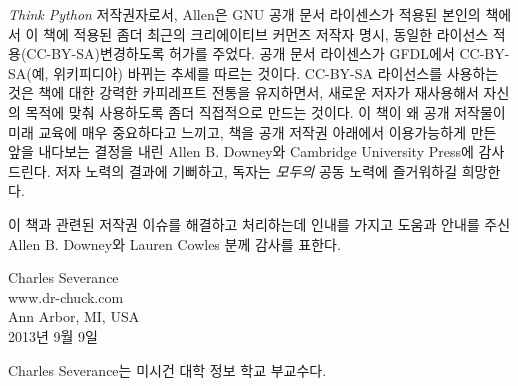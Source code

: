 
\emph{Think Python} 저작권자로서, Allen은 GNU 공개 문서 라이센스가 적용된 본인의 책에서 이 책에 적용된 좀더 최근의 크리에이티브 커먼즈 저작자 명시, 동일한 라이선스 적용(CC-BY-SA)변경하도록 허가를 주었다. 
공개 문서 라이센스가 GFDL에서 CC-BY-SA(예, 위키피디아) 바뀌는 추세를 따르는 것이다.
CC-BY-SA 라이선스를 사용하는 것은 책에 대한 강력한 카피레프트 전통을 유지하면서, 새로운 저자가 재사용해서 자신의 목적에 맞춰 사용하도록 좀더 직접적으로 만드는 것이다.
이 책이 왜 공개 저작물이 미래 교육에 매우 중요하다고 느끼고, 책을 공개 저작권 아래에서 이용가능하게 만든 앞을 내다보는 결정을 내린 Allen B. Downey와 Cambridge University Press에 감사드린다. 저자 노력의 결과에 기뻐하고, 독자는 \emph{모두의} 공동 노력에 즐거워하길 희망한다.

이 책과 관련된 저작권 이슈를 해결하고 처리하는데 인내를 가지고 도움과 안내를 주신 Allen B. Downey와 Lauren Cowles 분께 감사를 표한다.

Charles Severance\\
www.dr-chuck.com\\
Ann Arbor, MI, USA\\
2013년 9월 9일

Charles Severance는 미시건 대학 정보 학교 부교수다.

\clearemptydoublepage

\begin{latexonly}

\tableofcontents

\clearemptydoublepage

\end{latexonly}

\mainmatter

